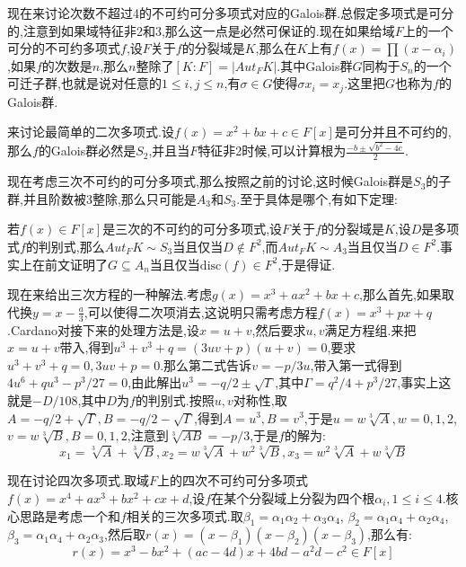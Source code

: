 现在来讨论次数不超过4的不可约可分多项式对应的Galois群.总假定多项式是可分的,注意到如果域特征非2和3,那么这一点是必然可保证的.现在如果给域$F$上的一个可分的不可约多项式$f$,设$F$关于$f$的分裂域是$K$,那么在$K$上有$f(x)=\prod(x-\alpha_i)$,如果$f$的次数是$n$,那么$n$整除了$[K:F]=|Aut_FK|$.其中Galois群$G$同构于$S_n$的一个可迁子群,也就是说对任意的$1\le i,j\le n$,有$\sigma\in G$使得$\sigma x_i=x_j$.这里把$G$也称为$f$的Galois群.

来讨论最简单的二次多项式.设$f(x)=x^2+bx+c\in F[x]$是可分并且不可约的,那么$f$的Galois群必然是$S_2$,并且当$F$特征非2时候,可以计算根为$\frac{-b\pm\sqrt{b^2-4c}}{2}$.

现在考虑三次不可约的可分多项式,那么按照之前的讨论,这时候Galois群是$S_3$的子群,并且阶数被3整除,那么只可能是$A_3$和$S_3$.至于具体是哪个,有如下定理:

若$f(x)\in F[x]$是三次的不可约的可分多项式,设$F$关于$f$的分裂域是$K$,设$D$是多项式$f$的判别式,那么$Aut_FK\sim S_3$当且仅当$D\not\in F^2$,而$Aut_FK\sim A_3$当且仅当$D\in F^2$.事实上在前文证明了$G\subseteq A_n$当且仅当$\mathrm{disc}(f)\in F^2$,于是得证.

现在来给出三次方程的一种解法.考虑$g(x)=x^3+ax^2+bx+c$,那么首先,如果取代换$y=x-\frac{a}{3}$,可以使得二次项消去,这说明只需考虑方程$f(x)=x^3+px+q$.Cardano对接下来的处理方法是,设$x=u+v$,然后要求$u,v$满足方程组.来把$x=u+v$带入,得到$u^3+v^3+q=(3uv+p)(u+v)=0$,要求$u^3+v^3+q=0,3uv+p=0$.那么第二式告诉$v=-p/3u$,带入第一式得到$4u^6+qu^3-p^3/27=0$,由此解出$u^3=-q/2\pm\sqrt{\Gamma}$,其中$\Gamma=q^2/4+p^3/27$,事实上这就是$-D/108$,其中$D$为$f$的判别式.按照$u,v$对称性,取$A=-q/2+\sqrt{\Gamma},B=-q/2-\sqrt{\Gamma}$,得到$A=u^3,B=v^3$,于是$u=w\sqrt[3]{A},w=0,1,2$, $v=w\sqrt[3]{B},B=0,1,2$,注意到$\sqrt[3]{AB}=-p/3$,于是$f$的解为:
$$x_1=\sqrt[3]{A}+\sqrt[3]{B},x_2=w\sqrt[3]{A}+w^2\sqrt[3]{B},x_3=w^2\sqrt[3]{A}+w\sqrt[3]{B}$$

现在讨论四次多项式.取域$F$上的四次不可约可分多项式$f(x)=x^4+ax^3+bx^2+cx+d$,设$f$在某个分裂域上分裂为四个根$\alpha_i,1\le i\le4$.核心思路是考虑一个和$f$相关的三次多项式.取$\beta_1=\alpha_1\alpha_2+\alpha_3\alpha_4$, $\beta_2=\alpha_1\alpha_4+\alpha_2\alpha_4$,$\beta_3=\alpha_1\alpha_4+\alpha_2\alpha_3$,然后取$r(x)=(x-\beta_1)(x-\beta_2)(x-\beta_3)$,那么有:
$$r(x)=x^3-bx^2+(ac-4d)x+4bd-a^2d-c^2\in F[x]$$

